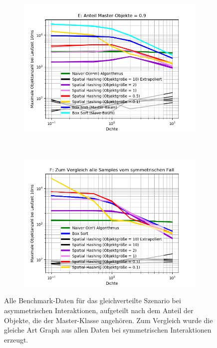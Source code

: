 \begin{figure}
\begin{subfigure}[t]{0.55\textwidth}
		\label{fig:asymComparison-D}
	\end{subfigure}
~
	\begin{subfigure}[t]{0.55\textwidth}
		\centering
		\includegraphics[width=1\textwidth]{./res/asymComparison-E.png}

		\label{fig:asymComparison-E}
	\end{subfigure}
~
	\begin{subfigure}[t]{0.55\textwidth}
		\centering
		\includegraphics[width=1\textwidth]{./res/asymComparison-F.png}

		\label{fig:asymComparison-F}
	\end{subfigure}

	\caption{Alle Benchmark-Daten für das gleichverteilte Szenario bei asymmetrischen Interaktionen, aufgeteilt nach dem Anteil der Objekte, die der Master-Klasse angehören. Zum Vergleich wurde die gleiche Art Graph aus allen Daten bei symmetrischen Interaktionen erzeugt.}
	\label{fig:asymComparison}
\end{figure}

